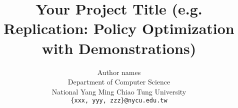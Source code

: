 \documentclass{article}
\title{Your Project Title (e.g. Replication: Policy Optimization with Demonstrations)}
\author{%
  Author names\\
  Department of Computer Science\\
  National Yang Ming Chiao Tung University\\
  \texttt{\{xxx, yyy, zzz\}@nycu.edu.tw}
}
\begin{document}
\maketitle











{
\small


}
\end{document}
